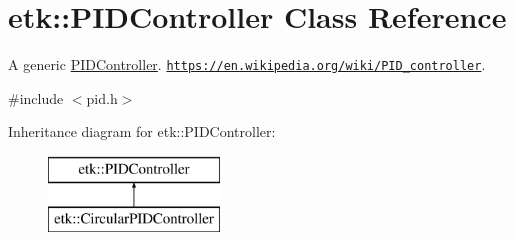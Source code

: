 \hypertarget{classetk_1_1_p_i_d_controller}{\section{etk\-:\-:P\-I\-D\-Controller Class Reference}
\label{classetk_1_1_p_i_d_controller}
}


A generic \hyperlink{classetk_1_1_p_i_d_controller}{P\-I\-D\-Controller}. \href{https://en.wikipedia.org/wiki/PID_controller}{\tt https\-://en.\-wikipedia.\-org/wiki/\-P\-I\-D\-\_\-controller}.  




{\ttfamily \#include $<$pid.\-h$>$}

Inheritance diagram for etk\-:\-:P\-I\-D\-Controller\-:\begin{figure}[H]
\begin{center}
\leavevmode
\includegraphics[height=2.000000cm]{classetk_1_1_p_i_d_controller}
\end{center}
\end{figure}
